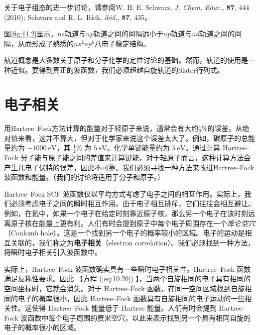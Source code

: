     关于电子组态的进一步讨论，请参阅W. H. E. Schwarz, \textit{J. Chem. Educ.}, \textbf{87}, 444 (2010); Schwarz and R. L. Rich, \textit{ibid.}, \textbf{87}, 435。

    图\ref{fig:11.2}显示，$ns$轨道与$np$轨道之间的间隔远小于$np$轨道与$nd$轨道之间的间隔，从而形成了熟悉的$ns^2np^6$八电子稳定结构。

    轨道概念是大多数关于原子和分子化学的定性讨论的基础。然而，轨道的使用是一种近似。要得到真正的波函数，我们必须超越自旋轨道的Slater行列式。

\section{电子相关}
\label{sec:11.3 Electron Correlation}

    用Hartree–Fock方法计算的能量对于轻原子来说，通常会有大约$\frac{1}{2}\%$的误差。从绝对值来看，这并不算大，但对于化学家来说这个误差太大了。例如，碳原子的总能量约为 $-1000 \:\mathrm{eV}$，其 $\frac{1}{2}\%$ 为 $5 \:\mathrm{eV}$。化学单键能量约为 $5 \:\mathrm{eV}$。通过计算 Hartree–Fock 分子能与原子能之间的差值来计算键能，对于轻原子而言，这种计算方法会产生几电子伏特的误差，因此不可靠。我们必须寻找一种方法来改进Hartree–Fock 波函数和能量。（我们的讨论将适用于分子和原子。）

    Hartree–Fock SCF 波函数仅以平均方式考虑了电子之间的相互作用。实际上，我们必须考虑电子之间的瞬时相互作用。由于电子相互排斥，它们往往会相互避让。例如，在氦中，如果一个电子在给定时刻靠近原子核，那么另一个电子在该时刻远离原子核在能量上更有利。人们有时会提到原子中每个电子周围存在一个\textit{库仑空穴}（Coulomb hole）。这是一个找到另一个电子的概率较小的区域。电子的运动是相互关联的，我们称之为\textbf{电子相关}（electron correlation）。我们必须找到一种方法，将瞬时电子相关引入波函数中。

    实际上，Hartree–Fock 波函数确实具有一些瞬时电子相关性。Hartree–Fock 函数满足反称性要求。因此 【方程 (\ref{eq:10.20}) 】，当两个自旋相同的电子具有相同的空间坐标时，它就会消失。对于 Hartree–Fock 函数，在同一空间区域找到自旋相同的电子的概率很小，因此 Hartree–Fock 函数具有自旋相同的电子运动的一些相关性。这使得 Hartree–Fock 能量低于 Hartree 能量。人们有时会提到 Hartree–Fock 波函数中每个电子周围的费米空穴，以此来表示找到另一个具有相同自旋的电子的概率很小的区域。

